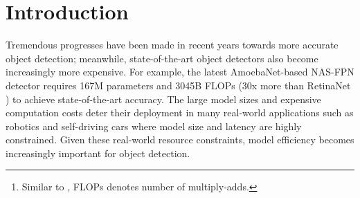 \documentclass[10pt,twocolumn,letterpaper]{article}
\begin{document}
\newcommand{\M}[1]{\mathcal{#1}}
\begin{abstract}

Model efficiency has become increasingly important in computer vision. In this paper, we systematically study neural network architecture design choices for object detection and propose several key optimizations to improve efficiency. First, we propose a weighted bi-directional feature pyramid network (BiFPN), which allows easy and fast multi-scale feature fusion; Second, we propose a compound scaling method that uniformly scales the resolution, depth, and width for all backbone, feature network, and box/class prediction networks at the same time. Based on these optimizations and better backbones, we have developed a new family of object detectors, called EfficientDet, which consistently achieve much better efficiency than prior art across a wide spectrum of resource constraints. In particular, with single-model and single-scale, our EfficientDet-D7 achieves state-of-the-art   on COCO   with 77M parameters and 410B FLOPs\footnote{Similar to \cite{resnet16,efficientnet19}, FLOPs denotes number of multiply-adds.},  being  smaller and using  fewer FLOPs than previous detectors. Code is available at  {\footnotesize \url{ https://github.com/google/automl/tree/master/efficientdet }}.
\end{abstract} 
\section{Introduction}
\label{sec:intro}


Tremendous progresses have been made in recent years towards more accurate object detection; meanwhile, state-of-the-art object detectors also become increasingly more expensive. For example, the latest AmoebaNet-based NAS-FPN detector \cite{odaa19} requires 167M parameters and 3045B FLOPs (30x more than RetinaNet \cite{retinanet17}) to achieve state-of-the-art accuracy. The large model sizes and expensive computation costs deter their deployment in many real-world applications such as robotics and self-driving cars where model size and latency are highly constrained. Given these real-world resource constraints, model efficiency becomes increasingly important for object detection.
\end{document}
